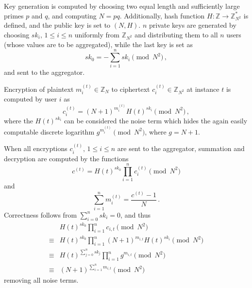 \documentclass[twocolumn]{autart}
\begin{document}
Key generation is computed by choosing two equal length and sufficiently large primes $p$ and $q$, and computing $N=pq$. Additionally, hash function $H:\mathbb{Z} \rightarrow \mathbb{Z}_{N^2}^*$ is defined, and the public key is set to $(N, H)$. $n$ private keys are generated by choosing $sk_i,\,1\leq i\leq n$ uniformly from $\mathbb{Z}_{N^2}$ and distributing them to all $n$ users (whose values are to be aggregated), while the last key is set as
\begin{equation}
    sk_0 = -\sum^{n}_{i=1}sk_i \pmod{N^2}\,,
\end{equation}
and sent to the aggregator.

Encryption of plaintext $m^{(t)}_{i} \in \mathbb{Z}_N$ to ciphertext $c^{(t)}_{i} \in \mathbb{Z}_{N^2}$ at instance $t$ is computed by user $i$ as
\begin{equation}
    c^{(t)}_{i} = (N+1)^{m^{(t)}_{i}} H(t)^{sk_i} \pmod{N^2}\,,
\end{equation}
where the $H(t)^{sk_i}$ can be considered the noise term which hides the again easily computable discrete logarithm $g^{m^{(t)}_{i}} \pmod{N^2}$, where $g=N+1$.

When all encryptions $c^{(t)}_{i},\,1\leq i \leq n$ are sent to the aggregator, summation and decryption are computed by the functions
\begin{equation}
    c^{(t)} = H(t)^{sk_0}\prod^{n}_{i=1}c^{(t)}_{i} \pmod{N^2}
\end{equation}
and
\begin{equation}
    \sum^{n}_{i=1}m^{(t)}_{i} = \frac{c^{(t)}-1}{N}\,. \label{eqn:agg_decryption}
\end{equation}
Correctness follows from $\sum^{n}_{i=0}sk_i = 0$, and thus
\begin{equation*}
    \begin{split}
        &H(t)^{sk_0}\prod^{n}_{i=1}c_{i,t} \pmod{N^2} \\
        \equiv &H(t)^{sk_0}\prod^{n}_{i=1}(N+1)^{m_{i,t}} H(t)^{sk_i} \pmod{N^2} \\
        \equiv &H(t)^{\sum^n_{j=0}sk_j} \prod^{n}_{i=1}g^{m_{i,t}} \pmod{N^2} \\
        \equiv &(N+1)^{\sum^n_{i=1}m_{i,t}} \pmod{N^2}
    \end{split}
\end{equation*}
removing all noise terms.
\end{document}
